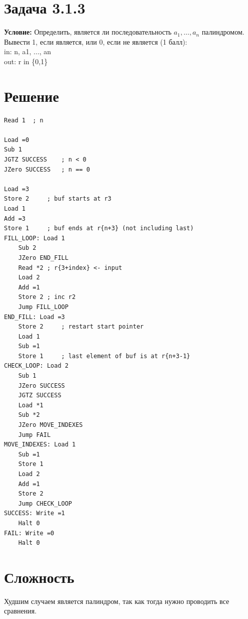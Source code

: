 \documentclass[12pt]{article}
\begin{document}
\section*{Задача 3.1.3}

\textbf{Условие:} Определить, является ли последовательность \(a_1, \dots, a_n\) палиндромом. Вывести 1, если является, или 0, если не является (1 балл):\\
in: n, a1, ..., an \\
out: r in \{0,1\}

\section*{Решение}

\begin{verbatim}
Read 1  ; n

Load =0
Sub 1
JGTZ SUCCESS    ; n < 0
JZero SUCCESS   ; n == 0

Load =3
Store 2     ; buf starts at r3
Load 1
Add =3
Store 1     ; buf ends at r{n+3} (not including last)
FILL_LOOP: Load 1
    Sub 2
    JZero END_FILL
    Read *2 ; r{3+index} <- input
    Load 2
    Add =1
    Store 2 ; inc r2
    Jump FILL_LOOP
END_FILL: Load =3
    Store 2     ; restart start pointer
    Load 1
    Sub =1
    Store 1     ; last element of buf is at r{n+3-1}
CHECK_LOOP: Load 2
    Sub 1
    JZero SUCCESS
    JGTZ SUCCESS
    Load *1
    Sub *2
    JZero MOVE_INDEXES
    Jump FAIL
MOVE_INDEXES: Load 1
    Sub =1
    Store 1
    Load 2
    Add =1
    Store 2
    Jump CHECK_LOOP
SUCCESS: Write =1
    Halt 0
FAIL: Write =0
    Halt 0
\end{verbatim}

\section*{Сложность}

Худшим случаем является палиндром, так как тогда нужно проводить все сравнения.
\end{document}
